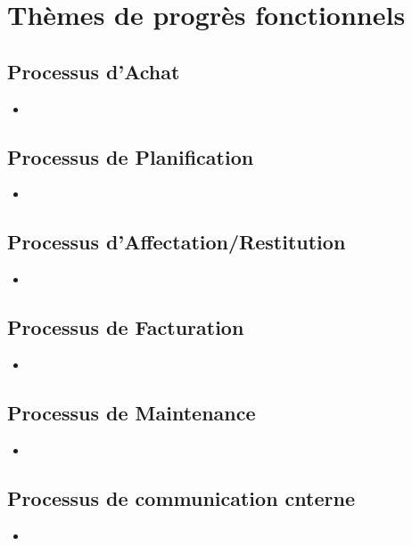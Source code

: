 \section{Thèmes de progrès fonctionnels}
        \subsection{Processus d'Achat}
        \begin{itemize}
                \item 
        \end{itemize}

        \subsection{Processus de Planification}
        \begin{itemize}
                \item 
        \end{itemize}

        \subsection{Processus d'Affectation/Restitution}
        \begin{itemize}
                \item 
        \end{itemize}

        \subsection{Processus de Facturation}
        \begin{itemize}
                \item 
        \end{itemize}

        \subsection{Processus de Maintenance}
        \begin{itemize}
                \item 
        \end{itemize}

        \subsection{Processus de communication cnterne}
        \begin{itemize}
                \item 
        \end{itemize}

